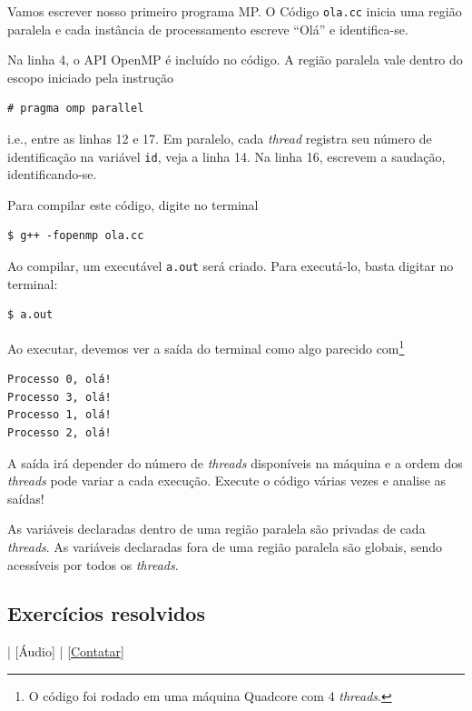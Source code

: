 Vamos escrever nosso primeiro programa MP. O Código \verb+ola.cc+ inicia uma região paralela e cada instância de processamento escreve ``Olá'' e identifica-se.



Na linha 4, o API OpenMP é incluído no código. A região paralela vale dentro do escopo iniciado pela instrução
\begin{verbatim}
# pragma omp parallel
\end{verbatim}
i.e., entre as linhas 12 e 17. Em paralelo, cada {\it thread} registra seu número de identificação na variável \verb+id+, veja a linha 14. Na linha 16, escrevem a saudação, identificando-se.

Para compilar este código, digite no terminal
\begin{verbatim}
$ g++ -fopenmp ola.cc
\end{verbatim}

Ao compilar, um executável \verb+a.out+ será criado. Para executá-lo, basta digitar no terminal:
\begin{verbatim}
$ a.out
\end{verbatim}

Ao executar, devemos ver a saída do terminal como algo parecido com\footnote{O código foi rodado em uma máquina Quadcore com 4 {\it threads}.}
\begin{verbatim}
Processo 0, olá!
Processo 3, olá!
Processo 1, olá!
Processo 2, olá!
\end{verbatim}

A saída irá depender do número de {\it threads} disponíveis na máquina e a ordem dos {\it threads} pode variar a cada execução. Execute o código várias vezes e analise as saídas!

\begin{obs}
  As variáveis declaradas dentro de uma região paralela são privadas de cada {\it threads}. As variáveis declaradas fora de uma região paralela são globais, sendo acessíveis por todos os {\it threads}.
\end{obs}

\subsection*{Exercícios resolvidos}

\begin{flushright}
  [Vídeo] | [Áudio] | \href{https://phkonzen.github.io/notas/contato.html}{[Contatar]}
\end{flushright}

